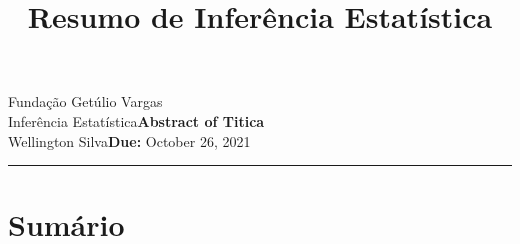 \documentclass{article}
\title{Resumo de Inferência Estatística}
\author{}
\date{}
\newcommand{\assignment}{Abstract of Titica}
\newcommand{\duedate}{October 26, 2021}
\begin{document}
Fundação Getúlio Vargas\hfill\\
Inferência Estatística\hfill\textbf{\assignment}\\
Wellington Silva\hfill\textbf{Due:} \duedate\\
\smallskip\hrule\bigskip

{\let\newpage\relax\maketitle}
\maketitle

\section*{Sumário}

\textbf{}
\vspace{4mm}

\textbf{}
\vspace{4mm}

\textbf{}
\vspace{4mm}

\textbf{}
\vspace{4mm}

\textbf{}
\vspace{4mm}

\textbf{}
\vspace{4mm}

\textbf{}
\vspace{4mm}

\textbf{}
\vspace{4mm}

\textbf{}
\vspace{4mm}

\textbf{}
\vspace{4mm}

\textbf{}
\vspace{4mm}

\textbf{}
\vspace{4mm}

\textbf{}
\vspace{4mm}

\textbf{}
\vspace{4mm}

\textbf{}
\vspace{4mm}
\end{document}
